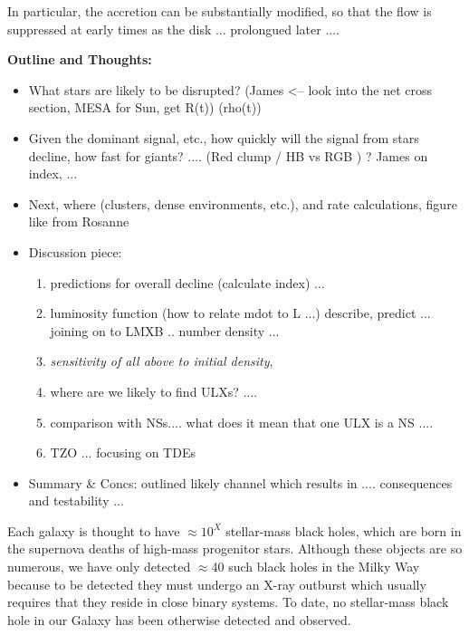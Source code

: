 In particular, the accretion can be substantially modified, so that the flow is suppressed at early times as the disk ... prolongued later .... 







\bf{Outline and Thoughts:}\\
\begin{itemize}
\item What stars are likely to be disrupted?  (James <-- look into the net cross section, MESA for Sun, get R(t)) (rho(t)) \\
\item Given the dominant signal, etc., how quickly will the signal from stars decline, how fast for giants? .... (Red clump / HB vs RGB ) ?  James on index, ... \\ 
\item Next, where (clusters, dense environments, etc.), and rate calculations, figure like from Rosanne \\
\item Discussion piece: 
\begin{enumerate}
    \item predictions for overall decline (calculate index) ... 
    \item luminosity function (how to relate mdot to L ...) describe, predict  ... joining on to LMXB .. number density ... 
    \item {\it sensitivity of all above to initial density},  
    \item where are we likely to find ULXs? .... 
    \item comparison with NSs.... what does it mean that one ULX is a NS .... 
    \item TZO ... focusing on TDEs 
    \end{enumerate}
    
\item Summary & Concs: outlined likely channel which results in .... consequences and testability ... 
\end{itemize}






Each galaxy is thought to have $\approx 10^X$ stellar-mass black
holes, which are born in the supernova deaths of high-mass progenitor
stars.  Although these objects are so numerous, we have only detected
$\approx$40 such black holes in the Milky Way because to be detected
they must undergo an X-ray outburst which usually requires that they
reside in close binary systems.  To date, no stellar-mass black hole
in our Galaxy has been otherwise detected and observed.


